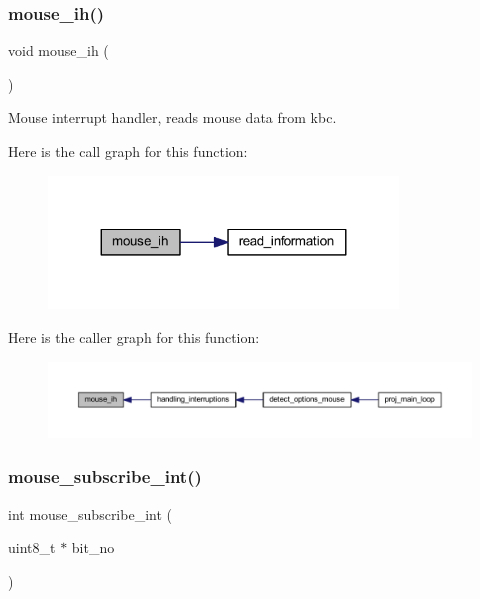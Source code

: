 \subsubsection{\texorpdfstring{mouse\+\_\+ih()}{mouse\_ih()}}
{\footnotesize\ttfamily void mouse\+\_\+ih (\begin{DoxyParamCaption}{ }\end{DoxyParamCaption})}



Mouse interrupt handler, reads mouse data from kbc. 

Here is the call graph for this function\+:
\nopagebreak
\begin{figure}[H]
\begin{center}
\leavevmode
\includegraphics[width=263pt]{group__mouse_ga834b6d7efe311484d6da234db333cb97_cgraph}
\end{center}
\end{figure}
Here is the caller graph for this function\+:
\nopagebreak
\begin{figure}[H]
\begin{center}
\leavevmode
\includegraphics[width=350pt]{group__mouse_ga834b6d7efe311484d6da234db333cb97_icgraph}
\end{center}
\end{figure}
\mbox{\label{group__mouse_ga9da18257ff113b686bb826d154bfaa87}} 
\subsubsection{\texorpdfstring{mouse\+\_\+subscribe\+\_\+int()}{mouse\_subscribe\_int()}}
{\footnotesize\ttfamily int mouse\+\_\+subscribe\+\_\+int (\begin{DoxyParamCaption}\item[{uint8\+\_\+t $\ast$}]{bit\+\_\+no }\end{DoxyParamCaption})}



